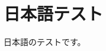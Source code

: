 \documentclass[uplatex,dvipdfmx,a4paper]{jsarticle}
\begin{document}
\section{日本語テスト}
日本語のテストです。
\end{document}
